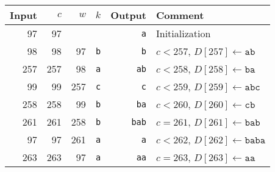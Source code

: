     \begin{tabular}{rrrrrl}
      Input & $c$    &    $w$ &     $k$ &  Output & Comment \\
      \hline
      97 &         97 &         &         & {\tt a} & Initialization\\
      98 &         98 &      97 & {\tt b} & {\tt b} & $c<257$, $D[257]\leftarrow\mathtt{ab}$\\
      257 &        257 &      98 & {\tt a} &{\tt ab} & $c<258$, $D[258]\leftarrow\mathtt{ba}$\\
      99 &         99 &     257 & {\tt c} & {\tt c} & $c<259$, $D[259]\leftarrow\mathtt{abc}$\\
      258 &        258 &      99 & {\tt b} &{\tt ba} & $c<260$, $D[260]\leftarrow\mathtt{cb}$\\
      261 &        261 &     258 & {\tt b} &{\tt bab}& $c=261$, $D[261]\leftarrow\mathtt{bab}$\\
      97 &         97 &     261 & {\tt a} & {\tt a} & $c<262$, $D[262]\leftarrow\mathtt{baba}$\\
      263 &        263 &      97 & {\tt a} &{\tt aa} & $c=263$, $D[263]\leftarrow\mathtt{aa}$
    \end{tabular}
